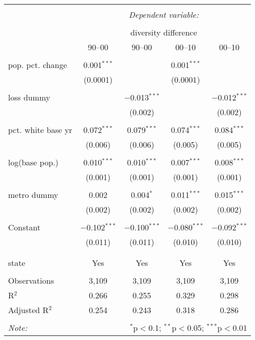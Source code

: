 \documentclass{standalone}
\begin{document}
\begin{tabular}{@{\extracolsep{5pt}}lcccc} 
\\[-1.8ex]\hline 
\hline \\[-1.8ex] 
 & \multicolumn{4}{c}{\textit{Dependent variable:}} \\ 
\cline{2-5} 
\\[-1.8ex] & \multicolumn{4}{c}{diversity difference} \\ 
 & 90--00 & 90--00 & 00--10 & 00--10 \\ 
\hline \\[-1.8ex] 
 pop. pct. change & 0.001$^{***}$ &  & 0.001$^{***}$ &  \\ 
  & (0.0001) &  & (0.0001) &  \\ 
  & & & & \\ 
 loss dummy &  & $-$0.013$^{***}$ &  & $-$0.012$^{***}$ \\ 
  &  & (0.002) &  & (0.002) \\ 
  & & & & \\ 
 pct. white base yr & 0.072$^{***}$ & 0.079$^{***}$ & 0.074$^{***}$ & 0.084$^{***}$ \\ 
  & (0.006) & (0.006) & (0.005) & (0.005) \\ 
  & & & & \\ 
 log(base pop.) & 0.010$^{***}$ & 0.010$^{***}$ & 0.007$^{***}$ & 0.008$^{***}$ \\ 
  & (0.001) & (0.001) & (0.001) & (0.001) \\ 
  & & & & \\ 
 metro dummy & 0.002 & 0.004$^{*}$ & 0.011$^{***}$ & 0.015$^{***}$ \\ 
  & (0.002) & (0.002) & (0.002) & (0.002) \\ 
  & & & & \\ 
 Constant & $-$0.102$^{***}$ & $-$0.100$^{***}$ & $-$0.080$^{***}$ & $-$0.092$^{***}$ \\ 
  & (0.011) & (0.011) & (0.010) & (0.010) \\ 
  & & & & \\ 
\hline \\[-1.8ex] 
state & Yes & Yes & Yes & Yes \\ 
\hline \\[-1.8ex] 
Observations & 3,109 & 3,109 & 3,109 & 3,109 \\ 
R$^{2}$ & 0.266 & 0.255 & 0.329 & 0.298 \\ 
Adjusted R$^{2}$ & 0.254 & 0.243 & 0.318 & 0.286 \\ 
\hline 
\hline \\[-1.8ex] 
\textit{Note:}  & \multicolumn{4}{r}{$^{*}$p$<$0.1; $^{**}$p$<$0.05; $^{***}$p$<$0.01} \\ 
\end{tabular} 
\end{document}
